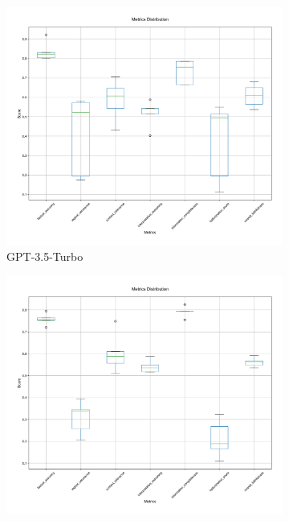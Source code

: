 \begin{figure}[!htbp]
\centering
\begin{subfigure}[b]{0.32\textwidth}
    \includegraphics[width=\textwidth]{figures/visualization/metrics_boxplot_gpt-3.5-turbo.png}
    \caption{GPT-3.5-Turbo}
    \label{fig:metrics_boxplot_gpt35}
\end{subfigure}
\hfill
\begin{subfigure}[b]{0.32\textwidth}
    \includegraphics[width=\textwidth]{figures/visualization/metrics_boxplot_gpt-4-turbo.png}

\end{subfigure}
\end{figure}
